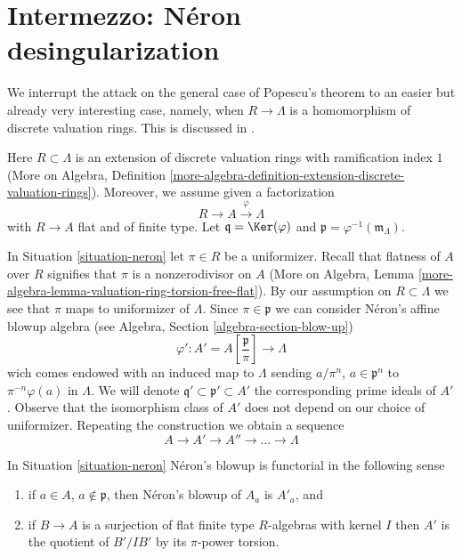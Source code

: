 \section{Intermezzo: N\'eron desingularization}
\label{section-neron}

\noindent
We interrupt the attack on the general case of Popescu's theorem to
an easier but already very interesting case, namely, when
$R \to \Lambda$ is a homomorphism of discrete valuation rings.
This is discussed in
\cite[Section 4]{Artin-Algebraic-Approximation}.

\begin{situation}
\label{situation-neron}
Here $R \subset \Lambda$ is an extension of discrete valuation rings
with ramification index $1$ (More on Algebra, Definition
\ref{more-algebra-definition-extension-discrete-valuation-rings}).
Moreover, we assume given a factorization
$$
R \to A \xrightarrow{\varphi} \Lambda
$$
with $R \to A$ flat and of finite type. Let $\mathfrak q = \Ker(\varphi)$
and $\mathfrak p = \varphi^{-1}(\mathfrak m_\Lambda)$.
\end{situation}

\noindent
In Situation \ref{situation-neron} let $\pi \in R$ be a uniformizer.
Recall that flatness of $A$ over $R$ signifies that $\pi$
is a nonzerodivisor on $A$
(More on Algebra, Lemma
\ref{more-algebra-lemma-valuation-ring-torsion-free-flat}).
By our assumption on $R \subset \Lambda$ we see that $\pi$ maps
to uniformizer of $\Lambda$. Since $\pi \in \mathfrak p$ we can consider
N\'eron's affine blowup algebra (see
Algebra, Section \ref{algebra-section-blow-up})
$$
\varphi' :
A' = A[\textstyle{\frac{\mathfrak p}{\pi}}]
\longrightarrow
\Lambda
$$
wich comes endowed with an induced map to $\Lambda$ sending
$a/\pi^n$, $a \in \mathfrak p^n$ to $\pi^{-n}\varphi(a)$ in $\Lambda$.
We will denote $\mathfrak q' \subset \mathfrak p' \subset A'$
the corresponding prime ideals of $A'$. Observe that the isomorphism
class of $A'$ does not depend on our choice of uniformizer.
Repeating the construction we obtain a sequence
$$
A \to A' \to A'' \to \ldots \to \Lambda
$$

\begin{lemma}
\label{lemma-neron-functorial}
In Situation \ref{situation-neron} N\'eron's blowup is functorial
in the following sense
\begin{enumerate}
\item if $a \in A$, $a \not \in \mathfrak p$, then N\'eron's blowup
of $A_a$ is $A'_a$, and
\item if $B \to A$ is a surjection of flat finite type $R$-algebras
with kernel $I$ then $A'$ is the quotient of $B'/IB'$ by its
$\pi$-power torsion.
\end{enumerate}
\end{lemma}

